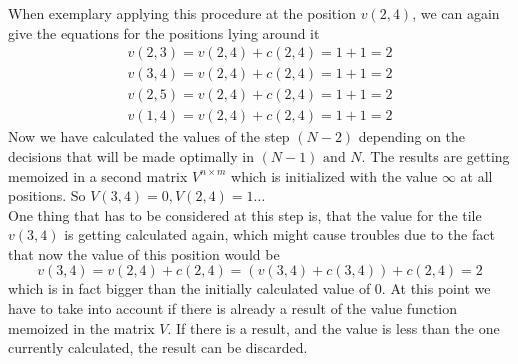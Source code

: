 \documentclass[conference]{IEEEtran}
\begin{document}
When exemplary applying this procedure at the position $v(2,4)$, we can again give the equations for the positions lying around it
\begin{align}
v(2,3) = v(2,4) + c(2,4) = 1 + 1 = 2\\
v(3,4) = v(2,4) + c(2,4) = 1 + 1 = 2\\
v(2,5) = v(2,4) + c(2,4) = 1 + 1 = 2\\
v(1,4) = v(2,4) + c(2,4) = 1 + 1 = 2
\end{align}
Now we have calculated the values of the step $(N-2)$ depending on the decisions that will be made optimally in $(N-1) \text{ and } N$. The results are getting memoized in a second matrix $V^{n \times m}$ which is initialized with the value $\infty$ at all positions. So $V(3,4) = 0, V(2,4)=1 \dots$\\ 
One thing that has to be considered at this step is, that the value for the tile $v(3,4)$ is getting calculated again, which might cause troubles due to the fact that now the value of this position would be
\begin{equation}
v(3,4) = v(2,4) + c(2,4) = (v(3,4) + c(3,4)) + c(2,4) = 2
\end{equation}
which is in fact bigger than the initially calculated value of $0$. At this point we have to take into account if there is already a result of the value function memoized in the matrix $V$. If there is a result, and the value is less than the one currently calculated, the result can be discarded.\\
\end{document}
